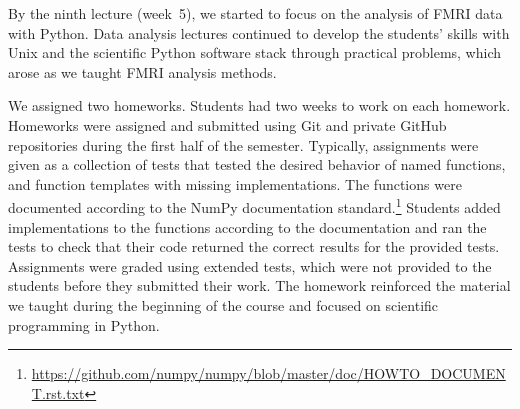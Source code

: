 By the ninth lecture (week~5), we started to focus on the analysis of FMRI data
with Python.
Data analysis lectures continued to develop the students' skills with
Unix and the scientific Python software stack through practical problems,
which arose as we taught FMRI analysis methods.

We assigned two homeworks.
Students had two weeks to work on each homework.
Homeworks were assigned and submitted using Git and private GitHub repositories during
the first half of the semester.
Typically, assignments were given as a collection of tests that tested the
desired behavior of named functions, and function templates with missing
implementations.
The functions were documented according to the NumPy documentation
standard.\footnote{\url{https://github.com/numpy/numpy/blob/master/doc/HOWTO_DOCUMENT.rst.txt}}
Students added implementations to the functions according to the documentation
and ran the tests to check that their code returned the correct results
for the provided tests.
Assignments were graded using extended tests, which were not provided to
the students before they submitted their work.
The homework reinforced the material we taught during the
beginning of the course and focused on scientific programming
in Python.

%

